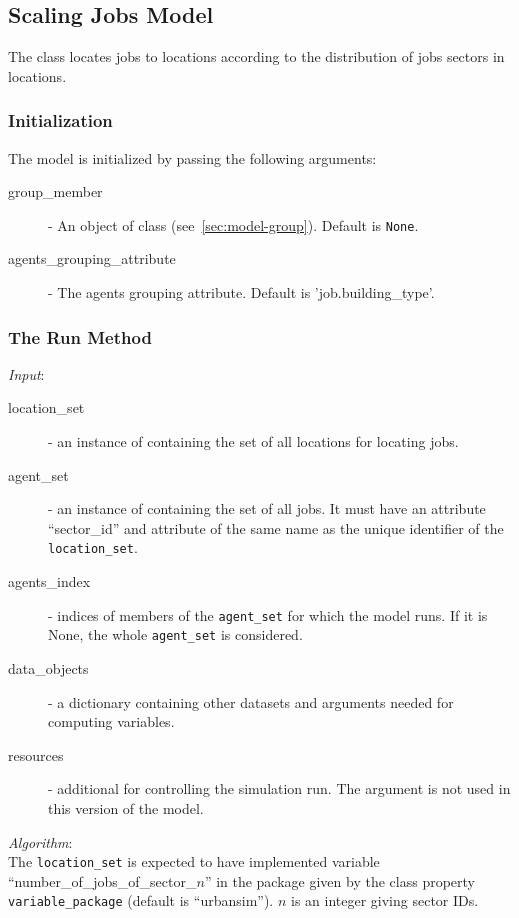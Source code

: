 \subsection{Scaling Jobs Model}
\modelsindex
%
\label{sec:scaling-jobs-model} 
%
The class  locates jobs to locations according to the
distribution of jobs sectors in locations. 
\subsubsection{Initialization}
The model is initialized by passing the following arguments:
\begin{description}
\item[group_member] - An object of class  (see~\ref{sec:model-group}). Default is \verb|None|.
\item[agents_grouping_attribute] - The agents grouping attribute. Default is 'job.building_type'.
\end{description}

\subsubsection{The Run Method}
%
{\it Input}:
\begin{description}
\item[location_set] - an instance of  containing the set of all
  locations for locating jobs.
\item[agent_set] - an instance of  containing the set of all
  jobs. It must have an attribute ``sector_id'' and attribute of the same name
  as the unique identifier of the \verb|location_set|.
\item[agents_index] - indices of members of the \verb|agent_set| for which the
  model runs. If it is None, the whole \verb|agent_set| is considered.
\item[data_objects] - a dictionary containing other datasets and arguments
  needed for computing variables.
\item[resources] - additional  for controlling the
  simulation run. The argument is not used in this version of the model. 
\end{description}

{\it Algorithm}:~\\[1mm]
The \verb|location_set| is expected to have implemented variable
 ``number_of_jobs_of_sector_$n$'' in the package
given by the class property \verb|variable_package| (default is
``urbansim'').  $n$ is an integer giving sector IDs.

